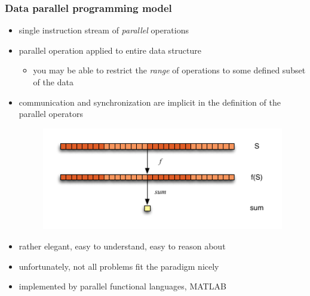 \begin{frame}[fragile]
%
  \frametitle{Data parallel programming model}
%
  \begin{itemize}
%
  \item single instruction stream of {\em parallel} operations
  \item parallel operation applied to entire data structure
    \begin{itemize}
      \item you may be able to restrict the {\em range} of operations to some defined subset of
        the data
    \end{itemize}
  \item communication and synchronization are implicit in the definition of the parallel
    operators
%
  \begin{figure}
    \centering
    \includegraphics[scale=1.0]{figures/reduction-simd.pdf}
    \label{fig:reduction-simd}
  \end{figure}
%
  \item rather elegant, easy to understand, easy to reason about
  \item unfortunately, not all problems fit the paradigm nicely
  \item implemented by parallel functional languages, MATLAB
%
  \end{itemize}
%
\end{frame}

